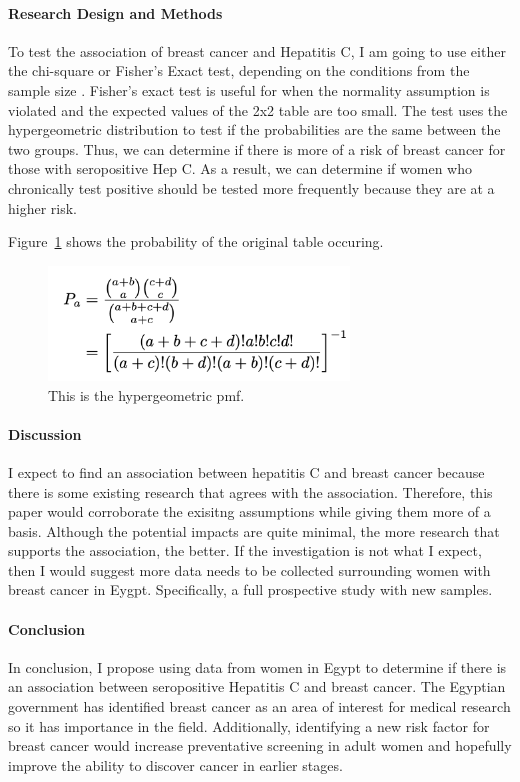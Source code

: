 \documentclass[12pt, titlepage]{article}
\begin{document}
\paragraph{Research Design and Methods}

To test the association of breast cancer and Hepatitis C, I am going to use either the chi-square or Fisher's Exact test, depending on the
conditions from the sample size \citep{warner2013testing}. Fisher's exact test is useful for when the normality assumption is violated 
and the expected values of the 2x2 table are too small. The test uses the hypergeometric distribution to test if the probabilities are
the same between the two groups. Thus, we can determine if there is more of a risk of breast cancer for those with seropositive Hep C. As
 a result, we can determine if women who chronically test positive should be tested more frequently because they are at a higher risk. 
 
Figure~\ref{fig:formula} shows the probability of the original table occuring.

\begin{figure}[tbp]
  \centering
  \includegraphics[width=8cm]{formula.png}
  \caption{This is the hypergeometric pmf.}
  \label{fig:formula}
\end{figure}


\paragraph{Discussion}

I expect to find an association between hepatitis C and breast cancer because there is some existing research that agrees with the association.
Therefore, this paper would corroborate the exisitng assumptions while giving them more of a basis. Although the potential impacts are quite 
minimal, the more research that supports the association, the better. If the investigation is not what I expect, then I would suggest more
data needs to be collected surrounding women with breast cancer in Eygpt. Specifically, a full prospective study with new samples. 

\paragraph{Conclusion}

In conclusion, I propose using data from women in Egypt to determine if there is an association between seropositive Hepatitis C and 
breast cancer. The Egyptian government has identified breast cancer as an area of interest for medical research so it has importance in
the field. Additionally, identifying a new risk factor for breast cancer would increase preventative screening in adult women and hopefully 
improve the ability to discover cancer in earlier stages. 





\end{document}
